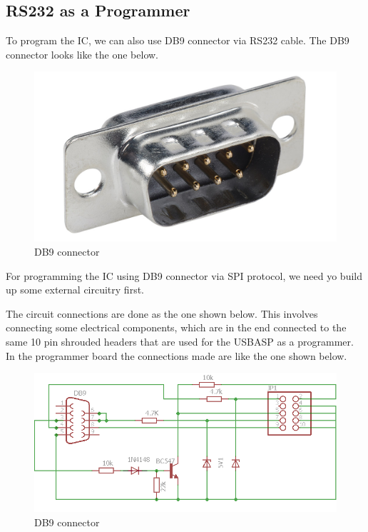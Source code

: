\documentclass[12pt]{article}
\begin{document}
\subsection{RS232 as a Programmer}
To program the IC, we can also use DB9 connector via RS232 cable. The DB9 connector looks like the one below.\vspace{12pt} 
\begin{figure}[h!]
\centering
\includegraphics[scale=0.1]{DB9M.png}
\caption{DB9 connector}
\end{figure}


For programming the IC using DB9 connector via SPI protocol, we need yo build up some external circuitry first.

The circuit connections are done as the one shown below. This involves connecting some electrical components, which are in the end connected to the same 10 pin shrouded headers that are used for the USBASP as a programmer. In the programmer board the connections made are like the one shown below.
\vspace{12pt}
\begin{figure}[h!]
\centering
\includegraphics[scale=1]{Makedb9.png}
\caption{DB9 connector}
\end{figure}
\vspace{12pt}
\end{document}
